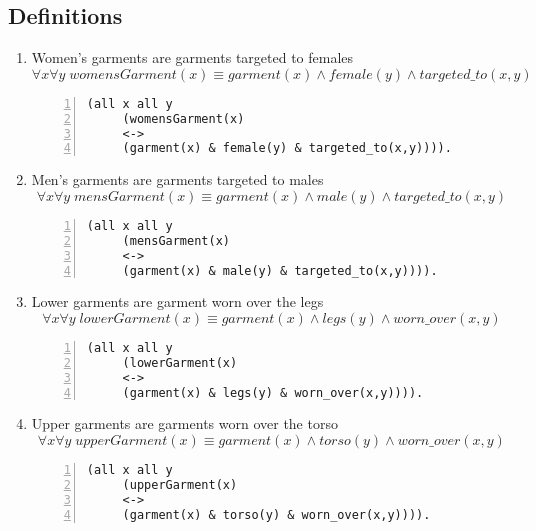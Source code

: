 \documentclass[paper=a4, fontsize=11pt]{scrartcl} %
\numberwithin{equation}{section} %
\numberwithin{figure}{section} %
\numberwithin{table}{section} %
\begin{document}
\subsection{Definitions}
\begin{enumerate}

	\item Women's garments are garments targeted to females
	\begin{equation*}
		\forall x \forall y \; womensGarment(x) \equiv garment(x) \land female(y) \land targeted\_to(x,y)
	\end{equation*}
	\begin{Verbatim}[frame=lines,gobble=2,numbers=left]
	 (all x all y 
	 (womensGarment(x) 
	 <-> 
	 (garment(x) & female(y) & targeted_to(x,y)))).
	\end{Verbatim}


	\item Men's garments are garments targeted to males
	\begin{equation*}
		\forall x \forall y \; mensGarment(x) \equiv garment(x) \land male(y) \land targeted\_to(x,y)
	\end{equation*}
	\begin{Verbatim}[frame=lines,gobble=2,numbers=left]
	 (all x all y
	 (mensGarment(x) 
	 <-> 
	 (garment(x) & male(y) & targeted_to(x,y)))). 
	\end{Verbatim}

	
	\item Lower garments are garment worn over the legs 
	\begin{equation*}
		\forall x \forall y \; lowerGarment(x) \equiv garment(x) \land legs(y) \land worn\_over(x,y)
	\end{equation*}
	\begin{Verbatim}[frame=lines,gobble=2,numbers=left]
	 (all x all y
	 (lowerGarment(x) 
	 <-> 
	 (garment(x) & legs(y) & worn_over(x,y)))). 
	\end{Verbatim}

	
	\item Upper garments are garments worn over the torso 
	\begin{equation*}
		\forall x \forall y \; upperGarment(x) \equiv garment(x) \land torso(y) \land worn\_over(x,y)
	\end{equation*}
	\begin{Verbatim}[frame=lines,gobble=2,numbers=left]
	 (all x all y
	 (upperGarment(x) 
	 <-> 
	 (garment(x) & torso(y) & worn_over(x,y)))). 
	\end{Verbatim}


\end{enumerate}
\end{document}

